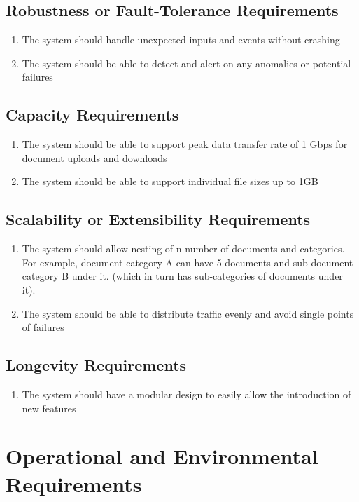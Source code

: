 \documentclass[12pt]{article}
\begin{document}
\subsection{Robustness or Fault-Tolerance Requirements}
\begin{enumerate}[{PR-RFT}1.]
  \item The system should handle unexpected inputs and events without crashing
  \item The system should be able to detect and alert on any
    anomalies or potential failures
\end{enumerate}

\subsection{Capacity Requirements}
\begin{enumerate}[{PR-CR}1.]
  \item The system should be able to support peak data transfer rate
    of 1 Gbps for document uploads and downloads
  \item The system should be able to support individual file sizes up to 1GB
\end{enumerate}

\subsection{Scalability or Extensibility Requirements}
\begin{enumerate}[{PR-SE}1.]
  \item The system should allow nesting of n number of documents and
    categories. For example, document category A can have 5 documents
    and sub document category B under it. (which in turn has
    sub-categories of documents under it).
  \item The system should be able to distribute traffic evenly and
    avoid single points of failures
\end{enumerate}

\subsection{Longevity Requirements}
\begin{enumerate}[{PR-LR}1.]
  \item The system should have a modular design to easily allow the
    introduction of new features
\end{enumerate}

\section{Operational and Environmental Requirements}
\end{document}
